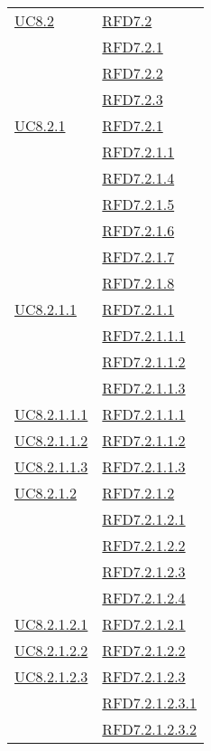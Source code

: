 \begin{longtable}{|>{\centering}m{5cm}|m{5cm}<{\centering}|}
\hyperref[UC8.2]{UC8.2} & \hyperlink{RFD7.2}{RFD7.2}\\
& \hyperlink{RFD7.2.1}{RFD7.2.1}\\
& \hyperlink{RFD7.2.2}{RFD7.2.2}\\
& \hyperlink{RFD7.2.3}{RFD7.2.3}\\ \hline
\hyperref[UC8.2.1]{UC8.2.1} & \hyperlink{RFD7.2.1}{RFD7.2.1}\\
& \hyperlink{RFD7.2.1.1}{RFD7.2.1.1}\\
& \hyperlink{RFD7.2.1.4}{RFD7.2.1.4}\\
& \hyperlink{RFD7.2.1.5}{RFD7.2.1.5}\\
& \hyperlink{RFD7.2.1.6}{RFD7.2.1.6}\\
& \hyperlink{RFD7.2.1.7}{RFD7.2.1.7}\\
& \hyperlink{RFD7.2.1.8}{RFD7.2.1.8}\\ \hline
\hyperref[UC8.2.1.1]{UC8.2.1.1} & \hyperlink{RFD7.2.1.1}{RFD7.2.1.1}\\
& \hyperlink{RFD7.2.1.1.1}{RFD7.2.1.1.1}\\
& \hyperlink{RFD7.2.1.1.2}{RFD7.2.1.1.2}\\
& \hyperlink{RFD7.2.1.1.3}{RFD7.2.1.1.3}\\ \hline
\hyperref[UC8.2.1.1.1]{UC8.2.1.1.1} & \hyperlink{RFD7.2.1.1.1}{RFD7.2.1.1.1}\\ \hline
\hyperref[UC8.2.1.1.2]{UC8.2.1.1.2} & \hyperlink{RFD7.2.1.1.2}{RFD7.2.1.1.2}\\ \hline
\hyperref[UC8.2.1.1.3]{UC8.2.1.1.3} & \hyperlink{RFD7.2.1.1.3}{RFD7.2.1.1.3}\\ \hline
\hyperref[UC8.2.1.2]{UC8.2.1.2} & \hyperlink{RFD7.2.1.2}{RFD7.2.1.2}\\
& \hyperlink{RFD7.2.1.2.1}{RFD7.2.1.2.1}\\
& \hyperlink{RFD7.2.1.2.2}{RFD7.2.1.2.2}\\
& \hyperlink{RFD7.2.1.2.3}{RFD7.2.1.2.3}\\
& \hyperlink{RFD7.2.1.2.4}{RFD7.2.1.2.4}\\ \hline
\hyperref[UC8.2.1.2.1]{UC8.2.1.2.1} & \hyperlink{RFD7.2.1.2.1}{RFD7.2.1.2.1}\\ \hline
\hyperref[UC8.2.1.2.2]{UC8.2.1.2.2} & \hyperlink{RFD7.2.1.2.2}{RFD7.2.1.2.2}\\ \hline
\hyperref[UC8.2.1.2.3]{UC8.2.1.2.3} & \hyperlink{RFD7.2.1.2.3}{RFD7.2.1.2.3}\\
& \hyperlink{RFD7.2.1.2.3.1}{RFD7.2.1.2.3.1}\\
& \hyperlink{RFD7.2.1.2.3.2}{RFD7.2.1.2.3.2}\\ \hline

\end{longtable}
